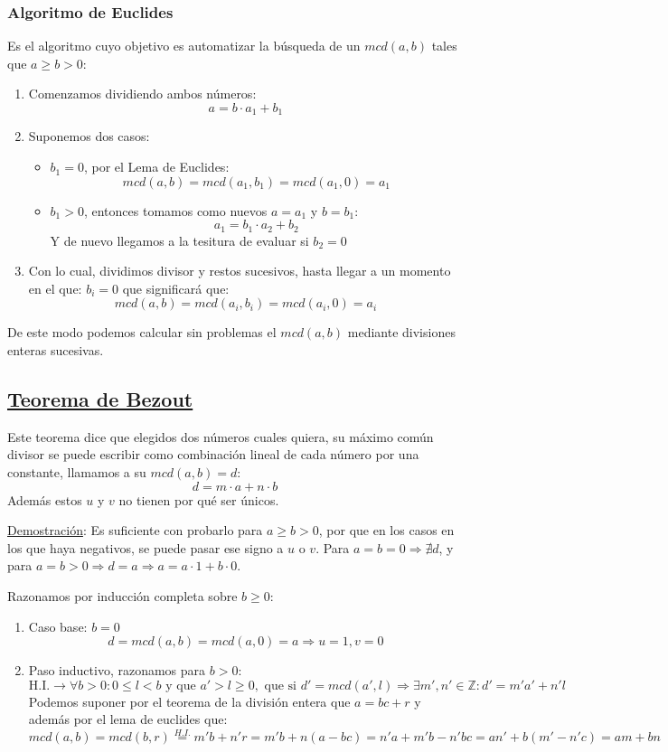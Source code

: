 \documentclass[10pt,a4paper,openright]{book}
\begin{document}
\subsubsection*{Algoritmo de Euclides}
Es el algoritmo cuyo objetivo es automatizar la búsqueda de un $mcd(a,b)$ tales que $a\geq b>0$:
\begin{enumerate}
\item Comenzamos dividiendo ambos números:
$$a=b\cdot a_1+ b_1$$
\item Suponemos dos casos:
	\begin{itemize}
	\item $b_1=0$, por el Lema de Euclides:
	$$mcd(a,b)=mcd(a_1,b_1)=mcd(a_1,0)=a_1$$
	
	\item $b_1>0$, entonces tomamos como nuevos $a=a_1$ y $b=b_1$:
	$$a_1=b_1\cdot a_2 + b_2$$
	Y de nuevo llegamos a la tesitura de evaluar si $b_2=0$
	\end{itemize}
\item Con lo cual, dividimos divisor y restos sucesivos, hasta llegar a un momento en el que: $b_i=0$ que significará que:
$$mcd(a,b)=mcd(a_i,b_i)=mcd(a_i,0)=a_i$$
\end{enumerate}
De este modo podemos calcular sin problemas el $mcd(a,b)$ mediante divisiones enteras sucesivas.

\subsection*{\underline{Teorema de Bezout}}
Este teorema dice que elegidos dos números cuales quiera, su máximo común divisor se puede escribir como combinación lineal de cada número por una constante, llamamos a su $mcd(a,b)=d$:
$$d=m\cdot a + n\cdot b$$
Además estos $u$ y $v$ no tienen por qué ser únicos.\par
	
\underline{Demostración}:
Es suficiente con probarlo para $a\geq b>0$, por que en los casos en los que haya negativos, se puede pasar ese signo a $u$ o $v$. Para $a=b=0\Rightarrow \nexists d$, y para $a=b>0\Rightarrow d=a\Rightarrow a=a\cdot 1+b\cdot 0$.\par

Razonamos por inducción completa sobre $b\geq 0$:
\begin{enumerate}
\item Caso base: $b=0$
$$d=mcd(a,b)=mcd(a,0)=a\Rightarrow u=1, v=0$$

\item Paso inductivo, razonamos para $b>0$:
$$\mbox{H.I.} \rightarrow \forall b >0: 0\leq l <b\mbox{ y que } a'>l\geq 0,\mbox{ que si }d'=mcd(a',l)\Rightarrow \exists m',n'\in \mathbb Z: d'=m'a'+n'l$$
Podemos suponer por el teorema de la división entera que $a=bc+r$ y además por el lema de euclides que:
$$mcd(a,b)=mcd(b,r)\stackrel{H.I.}{=}m'b+n'r=m'b+n(a-bc)=n'a+m'b-n'bc	=an'+b(m'-n'c)=am+bn$$
\end{enumerate}
\end{document}
